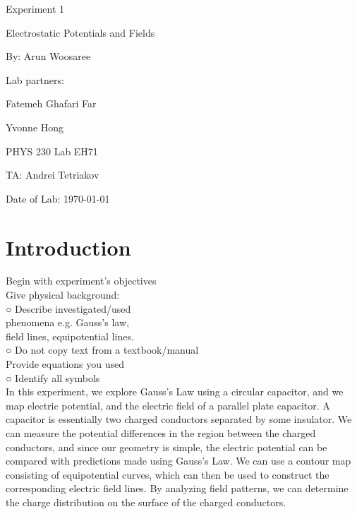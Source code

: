 \documentclass[letterpaper]{article}
\begin{document}
  \begin{titlepage}
    \begin{center}
        \vspace*{1cm}
        \Huge
        Experiment 1
        \vspace{1cm}

        Electrostatic Potentials and Fields
        \vspace{1cm}

        By: Arun Woosaree
        \vspace{1cm}

        Lab partners:
        \vspace{.25cm}
        \Large

        Fatemeh Ghafari Far

        Yvonne Hong
        \vspace{1cm}

        \Huge
        PHYS 230 Lab EH71
        \vspace{1cm}

        TA: Andrei Tetriakov
        \vspace{1cm}

        Date of Lab: \today
        \vfill
    \end{center}
\end{titlepage}

\section{Introduction}
Begin with experiment’s objectives\\
Give physical background:\\
○ Describe investigated/used\\
phenomena e.g. Gauss’s law,\\
field lines, equipotential lines.\\
○ Do not copy text from a
textbook/manual\\
Provide equations you used\\
○ Identify all symbols\\

In this experiment, we explore Gauss's Law using a circular capacitor, and
we map electric potential, and the electric field of a parallel plate capacitor.
A capacitor is essentially two charged conductors separated by some insulator.
We can measure the potential differences in the region between the charged conductors,
and since our geometry is simple, the electric potential can be compared with
predictions made using Gauss's Law. We can use a contour map consisting of equipotential
curves, which can then be used to construct the corresponding electric field lines.
By analyzing field patterns, we can determine the charge distribution on the surface of
the charged conductors.
\end{document}
